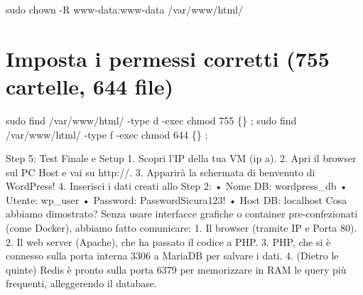 \documentclass[11pt,a4paper]{article}
\begin{document}
sudo chown -R www-data:www-data /var/www/html/

\section{Imposta i permessi corretti (755 cartelle, 644
file)}\label{imposta-i-permessi-corretti-755-cartelle-644-file}

sudo find /var/www/html/ -type d -exec chmod 755 \{\} ; sudo find
/var/www/html/ -type f -exec chmod 644 \{\} ;

Step 5: Test Finale e Setup 1. Scopri l'IP della tua VM (ip a). 2. Apri
il browser sul PC Host e vai su http://. 3. Apparirà la schermata di
benvenuto di WordPress! 4. Inserisci i dati creati allo Step 2: • Nome
DB: wordpress\_db • Utente: wp\_user • Password: PasswordSicura123! •
Host DB: localhost Cosa abbiamo dimostrato? Senza usare interfacce
grafiche o container pre-confezionati (come Docker), abbiamo fatto
comunicare: 1. Il browser (tramite IP e Porta 80). 2. Il web server
(Apache), che ha passato il codice a PHP. 3. PHP, che si è connesso
sulla porta interna 3306 a MariaDB per salvare i dati. 4. (Dietro le
quinte) Redis è pronto sulla porta 6379 per memorizzare in RAM le query
più frequenti, alleggerendo il database.


\end{document}
